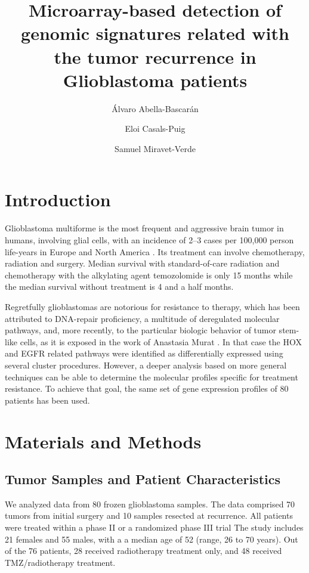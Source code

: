 \documentclass[9pt,twocolumn,twoside]{gsajnl}
\title{Microarray-based detection of genomic signatures related with the tumor recurrence in Glioblastoma patients}
\author[$\ast$,1]{Álvaro Abella-Bascarán}
\author[$\ast$]{Eloi Casals-Puig}
\author[$\ast$]{Samuel Miravet-Verde}
\affil[$\ast$]{Pompeu Fabra University, Barcelona (Spain)}
\begin{document}
\maketitle
\thispagestyle{firststyle}
\marginmark
\firstpagefootnote
{}

\vspace{-1cm}
\section*{Introduction}

Glioblastoma multiforme is the most frequent and aggressive brain tumor in humans, involving glial cells, with an incidence of 2–3 cases per 100,000 person life-years in Europe and North America \citep{Bleeker2012}. Its treatment can involve chemotherapy, radiation and surgery. Median survival with standard-of-care radiation and chemotherapy with the alkylating agent temozolomide is only 15 months  \citep{Johnson2012} while the median survival without treatment is 4 and a half months. 

Regretfully glioblastomas are notorious for resistance to therapy, which has been attributed to DNA-repair proficiency, a multitude of deregulated molecular pathways, and, more recently, to the particular biologic behavior of tumor stem-like cells, as it is exposed in the work of Anastasia Murat \citep{Murat2008}. In that case the HOX and EGFR related pathways were identified as differentially expressed using several cluster procedures. However, a deeper analysis based on more general techniques can be able to determine the molecular profiles specific for treatment resistance. To achieve that goal, the same set of gene expression profiles of 80 patients has been used. 

\section*{Materials and Methods}

\subsection*{Tumor Samples and Patient Characteristics}

We analyzed data from 80 frozen glioblastoma samples. The data comprised 70 tumors from initial surgery and 10 samples resected at recurrence. All patients were treated within a phase II or a randomized phase III trial \citep{Stupp2002,Stupp2005}
The study includes 21 females and 55 males, with a a median age of 52 (range, 26 to 70 years). Out of the 76 patients, 28 received radiotherapy treatment only, and 48 received TMZ/radiotherapy treatment.
\end{document}
